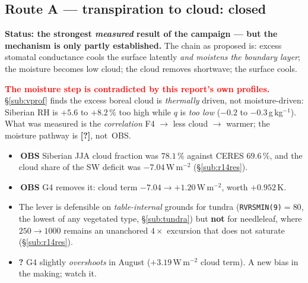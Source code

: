 \documentclass[10pt]{article}
\begin{document}
\subsection{Route A --- transpiration to cloud: closed}\label{sub:routea}
\textbf{Status: the strongest \emph{measured} result of the campaign --- but the mechanism is
only partly established.} The chain as proposed is: excess stomatal conductance cools the
surface latently \emph{and moistens the boundary layer}; the moisture becomes low cloud; the
cloud removes shortwave; the surface cools.

\textcolor{red}{\textbf{The moisture step is contradicted by this report's own profiles.}}
\S\ref{sub:vprof} finds the excess boreal cloud is \emph{thermally} driven, not
moisture-driven: Siberian RH is $+5.6$ to $+8.2\,\%$ too high while $q$ is \emph{too low}
($-0.2$ to $-0.3$\,g\,kg$^{-1}$). What was measured is the \emph{correlation} F4 $\to$ less
cloud $\to$ warmer; the moisture pathway is \textbf{[?]}, not \,OBS.

\begin{itemize}\itemsep2pt
\item {}\,\textbf{OBS} Siberian JJA cloud fraction was $78.1\,\%$ against CERES
  $69.6\,\%$, and the cloud share of the SW deficit was $-7.04$\,W\,m$^{-2}$
  (\S\ref{sub:r14res}).
\item {}\,\textbf{OBS} G4 removes it: cloud term $-7.04 \to +1.20$\,W\,m$^{-2}$,
  worth $+0.952$\,K.
\item The lever is defensible on \emph{table-internal} grounds for tundra
  (\texttt{RVRSMIN(9)}$=80$, the lowest of any vegetated type, \S\ref{sub:tundra}) but
  \textbf{not} for needleleaf, where $250\to1000$ remains an unanchored $4\times$
  excursion that does not saturate (\S\ref{sub:r14res}).
\item \textbf{?} G4 slightly \emph{overshoots} in August ($+3.19$\,W\,m$^{-2}$ cloud
  term). A new bias in the making; watch it.
\end{itemize}
\end{document}
